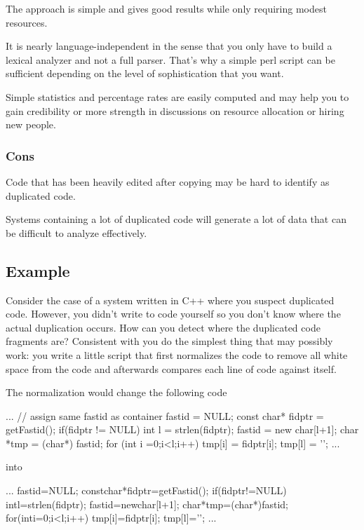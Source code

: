 \documentclass[a4paper,10pt,twoside]{book}
\begin{document}
\begin{bulletlist}
\item The approach is simple and gives good results while only requiring modest resources.

\item It is nearly language-independent in the sense that you only have to build a lexical analyzer and not a full parser. That's why a simple perl script can be sufficient depending on the level of sophistication that you want.

\item Simple statistics and percentage rates are easily computed and may help you to gain credibility or more strength in discussions on resource allocation or hiring new people.
\end{bulletlist}

\subsubsection*{Cons}

\begin{bulletlist}
\item Code that has been heavily edited after copying may be hard to identify as duplicated code.

\item Systems containing a lot of duplicated code will generate a lot of data that can be difficult to analyze effectively.
\end{bulletlist}

\subsection*{Example}

Consider the case of a system written in C++ where you suspect duplicated code. However, you didn't write to code yourself so you don't know where the actual duplication occurs. How can you detect where the duplicated code fragments are? Consistent with  you do the simplest thing that may possibly work: you write a little script that first normalizes the code to remove all white space from the code and afterwards compares each line of code against itself.

The normalization would change the following code


\begin{code}
...
// assign same fastid as container
fastid = NULL;
const char* fidptr = getFastid();
if(fidptr != NULL) {
	int l = strlen(fidptr);
	fastid = new char[l+1];
	char *tmp = (char*) fastid;
	for (int i =0;i<l;i++)
		tmp[i] = fidptr[i];
	tmp[l] = '\0';
}
...
\end{code}
into
\begin{code}
...
fastid=NULL;
constchar*fidptr=getFastid();
if(fidptr!=NULL)
intl=strlen(fidptr);
fastid=newchar[l+1];
char*tmp=(char*)fastid;
for(inti=0;i<l;i++)
tmp[i]=fidptr[i];
tmp[l]='\0';
...
\end{code}
\end{document}

